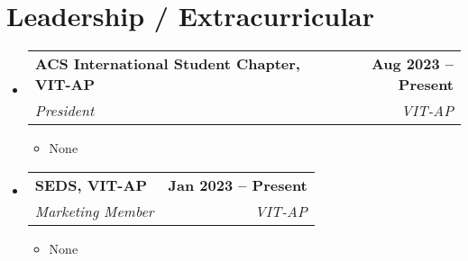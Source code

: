 \documentclass[letterpaper,11pt]{article}
\makeatletter
\newcommand{\resumeItem}[1]{
  \item\small{
    {#1 \vspace{-2pt}}
  }
}
\newcommand{\resumeSubheading}[4]{
  \vspace{-2pt}\item
    \begin{tabular*}{1.0\textwidth}[t]{l@{\extracolsep{\fill}}r}
      \textbf{#1} & \textbf{\small #2} \\
      \textit{\small#3} & \textit{\small #4} \\
    \end{tabular*}\vspace{-7pt}
}
\newcommand{\resumeSubHeadingListStart}{\begin{itemize}[leftmargin=0.0in, label={}]}
\newcommand{\resumeSubHeadingListEnd}{\end{itemize}}
\newcommand{\resumeItemListStart}{\begin{itemize}}
\newcommand{\resumeItemListEnd}{\end{itemize}\vspace{-5pt}}
\makeatother
\begin{document}
\section{Leadership / Extracurricular}
    \resumeSubHeadingListStart
        \resumeSubheading{ACS International Student Chapter, VIT-AP}{Aug 2023 -- Present}{President}{VIT-AP}
            \resumeItemListStart
                \resumeItem{None}
            \resumeItemListEnd
        \resumeSubheading{SEDS, VIT-AP}{Jan 2023 -- Present}{Marketing Member}{VIT-AP}
            \resumeItemListStart
                \resumeItem{None}
            \resumeItemListEnd
    \resumeSubHeadingListEnd
\end{document}
